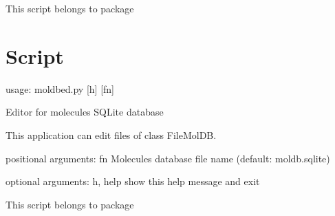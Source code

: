 \documentclass[letterpaper,10pt,english]{sphinxmanual}
\begin{document}
This script belongs to package 


\section{Script }
\label{\detokenize{autoscripts/script-moldbed::doc}}\label{\detokenize{autoscripts/script-moldbed:script-moldbed-py}}
\begin{sphinxVerbatim}[commandchars=\\\{\}]
usage: moldbed.py [\PYGZhy{}h] [fn]

Editor for molecules SQLite database

This application can edit files of class FileMolDB.

positional arguments:
  fn          Molecules database file name (default: moldb.sqlite)

optional arguments:
  \PYGZhy{}h, \PYGZhy{}\PYGZhy{}help  show this help message and exit
\end{sphinxVerbatim}

This script belongs to package 
\end{document}
